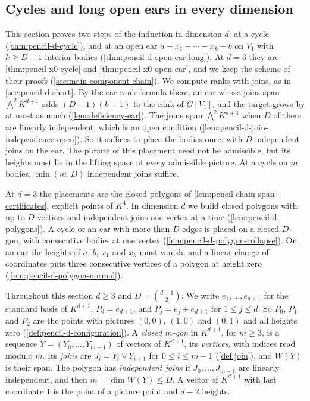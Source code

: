 \subsection{Cycles and long open ears in every dimension}
\label{sec:pencil-d-long}

This section proves two steps of the induction in dimension $d$: at a
cycle (\cref{thm:pencil-d-cycle}), and at an open ear
$a - x_1 - \cdots - x_k - b$ on $V_1$ with $k \ge D - 1$ interior bodies
(\cref{thm:pencil-d-open-ear-long}). At $d = 3$ they are
\cref{thm:pencil-x0-cycle} and \cref{thm:pencil-x0-open-ear}, and we keep
the scheme of their proofs (\cref{sec:main-component-chain}). We compute
ranks with joins, as in \cref{sec:pencil-d-short}. By the ear rank
formula there, an ear whose joins span $\bigwedge^2 K^{d+1}$ adds
$(D - 1)(k + 1)$ to the rank of $G[V_1]$, and the target grows by at
most as much (\cref{lem:deficiency-ear}). The joins span
$\bigwedge^2 K^{d+1}$ when $D$ of them are linearly independent, which
is an open condition (\cref{lem:pencil-d-join-independence-open}). So it
suffices to place the bodies once, with $D$ independent joins on the
ear. The picture of this placement need not be admissible, but its
heights must lie in the lifting space at every admissible picture. At a
cycle on $m$ bodies, $\min(m, D)$ independent joins suffice.

At $d = 3$ the placements are the closed polygons of
\cref{lem:pencil-chain-span-certificates}, explicit points of $K^4$. In
dimension $d$ we build closed polygons with up to $D$ vertices and
independent joins one vertex at a time (\cref{lem:pencil-d-polygons}).
A cycle or an ear with more than $D$ edges is placed on a closed
$D$-gon, with consecutive bodies at one vertex
(\cref{lem:pencil-d-polygon-collapse}). On an ear the heights of $a$,
$b$, $x_1$ and $x_k$ must vanish, and a linear change of coordinates
puts three consecutive vertices of a polygon at height zero
(\cref{lem:pencil-d-polygon-normal}).

Throughout this section $d \ge 3$ and $D = \binom{d+1}{2}$. We write
$e_1, \dots, e_{d+1}$ for the standard basis of $K^{d+1}$,
$P_0 = e_{d+1}$, and $P_j = e_j + e_{d+1}$ for $1 \le j \le d$. So
$P_0$, $P_1$ and $P_2$ are the points with pictures $(0, 0)$, $(1, 0)$
and $(0, 1)$ and all heights zero (\cref{def:pencil-d-configuration}).
A \emph{closed $m$-gon} in $K^{d+1}$, for $m \ge 3$, is a sequence
$Y = (Y_0, \dots, Y_{m-1})$ of vectors of $K^{d+1}$, its
\emph{vertices}, with indices read modulo $m$. Its \emph{joins} are
$J_i = Y_i \vee Y_{i+1}$ for $0 \le i \le m - 1$ (\cref{def:join}), and
$W(Y)$ is their span. The polygon has \emph{independent joins} if
$J_0, \dots, J_{m-1}$ are linearly independent, and then
$m = \dim W(Y) \le D$. A vector of $K^{d+1}$ with last coordinate $1$ is
the point of a picture point and $d - 2$ heights.


